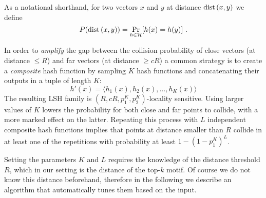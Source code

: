 As a notational shorthand, for two vectors $x$ and $y$ at distance $\operatorname{dist}\left(x, y\right)$ we define
\[
P(\operatorname{dist}\left(x, y\right)) = \Pr_{h\in \mathcal{H}}[h(x) = h(y)] ~.
\]

In order to \emph{amplify} the gap between the collision probability of close vectors
(at distance $\le R$) and far vectors (at distance $\ge cR$) a common strategy
is to create a \emph{composite} hash function by sampling $K$ hash functions and concatenating their outputs in a tuple of length $K$:
\[
    h'(x) = \langle
        h_1(x), h_2(x), \dots, h_K(x)
    \rangle
\]
The resulting LSH family is $(R, cR, p_1^K, p_2^K)$-locality sensitive.
Using larger values of $K$ lowers the probability for both close and far points to collide, with a more marked effect on the latter.
Repeating this process with $L$ independent composite hash functions implies that
points at distance smaller than $R$ collide in at least one of the repetitions with probability at least $1-\left(1- p_1^K\right)^L$.

Setting the parameters $K$ and $L$ requires the knowledge of the distance threshold
$R$, which in our setting is the distance of the top-$k$ motif.
Of course we do not know this distance beforehand, therefore in the following we describe
an algorithm that automatically tunes them based on the input.


